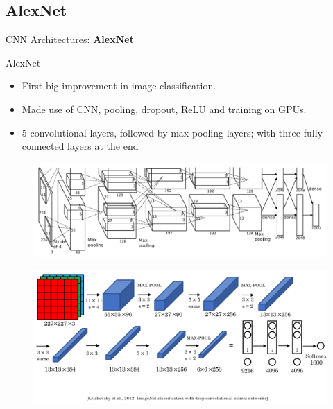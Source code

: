 \subsection{AlexNet}
\begin{frame}{}
    \LARGE CNN Architectures: \textbf{AlexNet}
\end{frame}

\begin{frame}[allowframebreaks]{AlexNet}
    \begin{itemize}
        \item First big improvement in image classification.
        \item Made use of CNN, pooling, dropout, ReLU and training on GPUs.
        \item 5 convolutional layers, followed by max-pooling layers; with three fully connected layers at the end

    \end{itemize}

    \begin{figure}
        \centering
        \includegraphics[width=1.0\textwidth,height=0.5\textheight,keepaspectratio]{images/cnn/alexnet.png}
    \end{figure}

\framebreak

    \begin{figure}
        \centering
        \includegraphics[width=1.0\textwidth,height=0.9\textheight,keepaspectratio]{images/cnn/alexnet-2.png}
    \end{figure}
\end{frame}